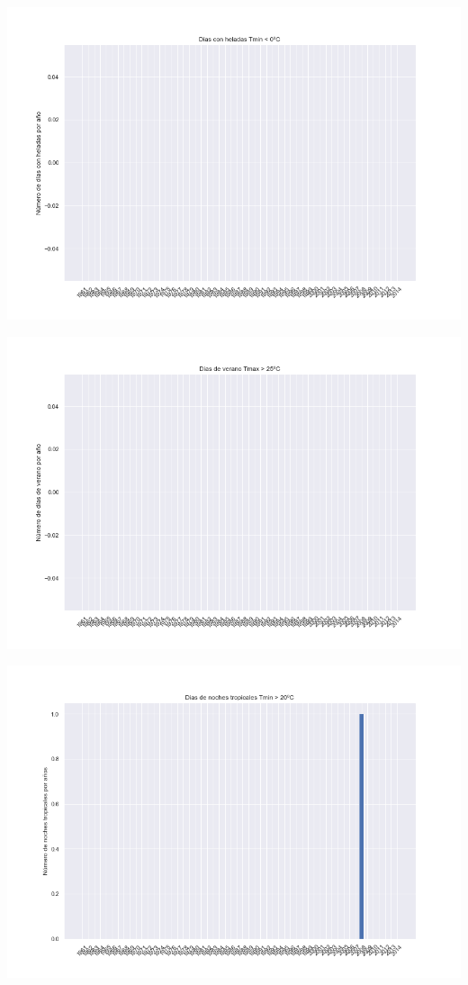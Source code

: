 \documentclass[12pt]{article}
\begin{document}
\begin{center}
\includegraphics[scale=0.5]{FD.png}
\end{center} 
\begin{center}
\includegraphics[scale=0.5]{SU.png}
\end{center} 
\begin{center}
\includegraphics[scale=0.5]{FR.png}
\end{center} 
\end{document}
